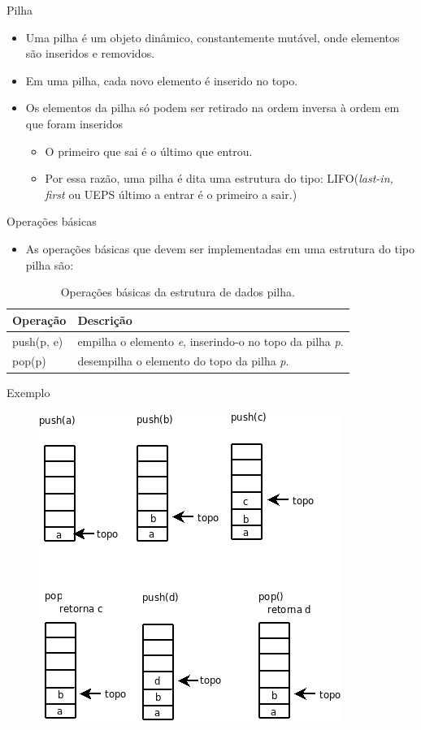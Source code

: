    \begin{frame}{Pilha}     
			\begin{itemize}
				\item Uma pilha é um objeto dinâmico, constantemente mutável, onde elementos são inseridos e removidos.
				\item Em uma pilha, cada novo elemento é inserido no topo.
				\item Os elementos da pilha só podem ser retirado na ordem inversa à ordem em que foram inseridos				
					\begin{itemize}
						\item O primeiro que sai é o último que entrou.
						\item Por essa razão, uma pilha é dita uma estrutura do tipo: \alert{LIFO}(\textit{last-in, first} ou UEPS último a entrar é o primeiro a sair.)
					\end{itemize}
			\end{itemize}
  \end{frame}
  
   \begin{frame}{Operações básicas}     
			\begin{itemize}
				\item As operações básicas que devem ser implementadas em uma estrutura do tipo pilha são:
			\end{itemize}
			\begin{table}[ht]
			  \centering
						\begin{tabular}{l|l}
						    \hline \textbf{Operação} & \textbf{Descrição} \\
						    \hline push(p, e) & empilha o elemento \textit{e}, inserindo-o no topo da pilha \textit{p}.\\
						    \hline pop(p) & desempilha o elemento do topo da pilha \textit{p}.\\
						    \hline 
						\end{tabular}
						\caption{Operações básicas da estrutura de dados pilha.}
				\end{table}
  \end{frame}
  
   \begin{frame}{Exemplo} 
		   	\begin{figure}[ht]
				\centering
				\includegraphics[width=.6\textwidth]{figs/fig_pilhas/pilha.png}					
			\end{figure} 
   \end{frame}
  
